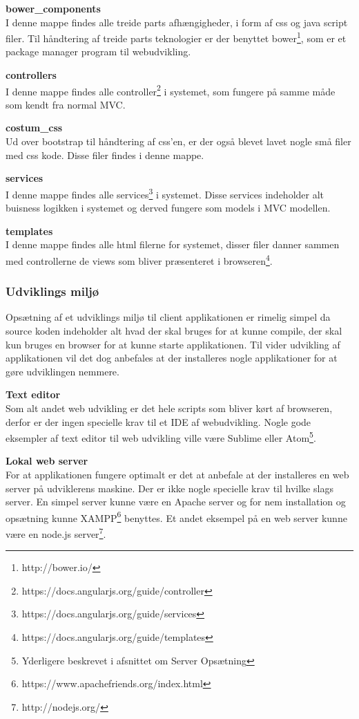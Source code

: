 \textbf{bower\_components}\\
I denne mappe findes alle treide parts afhængigheder, i form af css og java script filer. Til håndtering af treide parts teknologier er der benyttet bower\footnote{http://bower.io/}, som er et package manager program til webudvikling.

\textbf{controllers}\\
I denne mappe findes alle controller\footnote{https://docs.angularjs.org/guide/controller} i systemet, som fungere på samme måde som kendt fra normal MVC.

\textbf{costum\_css}\\
Ud over bootstrap til håndtering af css'en, er der også blevet lavet nogle små filer med css kode. Disse filer findes i denne mappe.

\textbf{services}\\
I denne mappe findes alle services\footnote{https://docs.angularjs.org/guide/services} i systemet. Disse services indeholder alt buisness logikken i systemet og derved fungere som models i MVC modellen.

\textbf{templates}\\
I denne mappe findes alle html filerne for systemet, disser filer danner sammen med controllerne de views som bliver præsenteret i browseren\footnote{https://docs.angularjs.org/guide/templates}.

\subsubsection*{Udviklings miljø}
Opsætning af et udviklings miljø til client applikationen er rimelig simpel da source koden indeholder alt hvad der skal bruges for at kunne compile, der skal kun bruges en browser for at kunne starte applikationen. Til vider udvikling af applikationen vil det dog anbefales at der installeres nogle applikationer for at gøre udviklingen nemmere.

\textbf{Text editor}\\
Som alt andet web udvikling er det hele scripts som bliver kørt af browseren, derfor er der ingen specielle krav til et IDE af webudvikling. Nogle gode eksempler af text editor til web udvikling ville være Sublime eller Atom\footnote{Yderligere beskrevet i afsnittet om Server Opsætning}.

\textbf{Lokal web server}\\
For at applikationen fungere optimalt er det at anbefale at der installeres en web server på udviklerens maskine. Der er ikke nogle specielle krav til hvilke slags server. En simpel server kunne være en Apache server og for nem installation og opsætning kunne XAMPP\footnote{https://www.apachefriends.org/index.html} benyttes. Et andet eksempel på en web server kunne være en node.js server\footnote{http://nodejs.org/}. 

